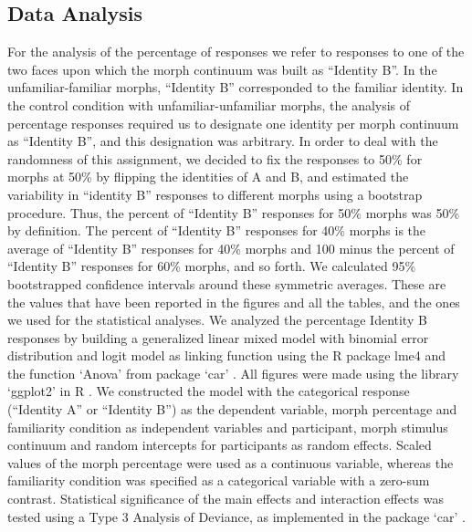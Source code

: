 \documentclass[10pt,letterpaper]{article}
\begin{document}
\subsection*{Data Analysis}
For the analysis of the percentage of responses we refer to responses to one of the two faces upon which the morph continuum was built as “Identity B”. In the unfamiliar-familiar morphs, “Identity B” corresponded to the familiar identity. In the control condition with unfamiliar-unfamiliar morphs, the analysis of percentage responses required us to designate one identity per morph continuum as “Identity B”, and this designation was arbitrary. In order to deal with the randomness of this assignment, we decided to fix the responses to 50\% for morphs at 50\% by flipping the identities of A and B, and estimated the variability in “identity B” responses to different morphs using a bootstrap procedure. Thus, the percent of “Identity B” responses for 50\% morphs was 50\% by definition.  The percent of “Identity B” responses for 40\% morphs is the average of “Identity B” responses for 40\% morphs and 100 minus the percent of “Identity B” responses for 60\% morphs, and so forth. We calculated 95\% bootstrapped confidence intervals around these symmetric averages. These are the values that have been reported in the figures and all the tables, and the ones we used for the statistical analyses.   
We analyzed the percentage Identity B responses by building a generalized linear mixed model with binomial error distribution and logit model as linking function using the R package lme4 \cite{bates2011package} and the function ‘Anova’ from package ‘car’ \cite{fox2012package}. All figures were made using the library ‘ggplot2’ in R \cite{wickham2011ggplot2}. We constructed the model with the categorical response (“Identity A” or “Identity B”) as the dependent variable, morph percentage and familiarity condition as independent variables and participant, morph stimulus continuum and random intercepts for participants as random effects. Scaled values of the morph percentage were used as a continuous variable, whereas the familiarity condition was specified as a categorical variable with a zero-sum contrast. Statistical significance of the main effects and interaction effects was tested using a Type 3 Analysis of Deviance, as implemented in the package ‘car’ \cite{fox2012package}.  
\end{document}
